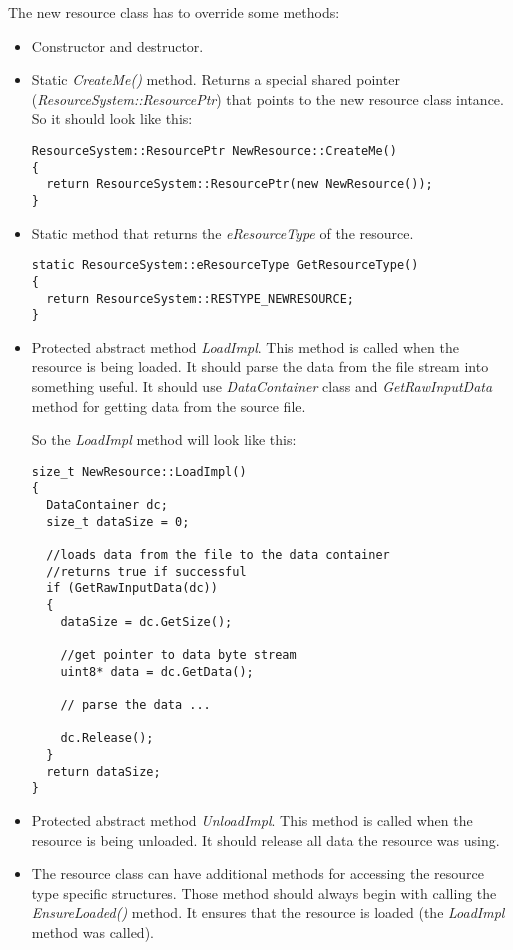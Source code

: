 \documentclass[a4paper, 12pt]{report}
\begin{document}
The new resource class has to override some methods:

\begin{itemize}
\item
Constructor and destructor.
\item
Static \emph{CreateMe()} method. Returns a special shared pointer (\emph{ResourceSystem::ResourcePtr}) that points to the new resource class intance. So it should look like this:

\footnotesize 
\begin{verbatim}
ResourceSystem::ResourcePtr NewResource::CreateMe()
{
  return ResourceSystem::ResourcePtr(new NewResource());
}
\end{verbatim}
\normalsize

\item
Static method that returns the \emph{eResourceType} of the resource.

\footnotesize 
\begin{verbatim}
static ResourceSystem::eResourceType GetResourceType() 
{ 
  return ResourceSystem::RESTYPE_NEWRESOURCE; 
}
\end{verbatim}
\normalsize

\item
Protected abstract method \emph{LoadImpl}. This method is called when the resource is being loaded. It should parse the data from the file stream into something useful. It should use \emph{DataContainer} class and \emph{GetRawInputData} method for getting data from the source file.

So the \emph{LoadImpl} method will look like this:

\footnotesize 
\begin{verbatim}
size_t NewResource::LoadImpl()
{
  DataContainer dc;
  size_t dataSize = 0;

  //loads data from the file to the data container
  //returns true if successful
  if (GetRawInputData(dc))	
  {
    dataSize = dc.GetSize();

    //get pointer to data byte stream
    uint8* data = dc.GetData();

    // parse the data ...

    dc.Release();
  }
  return dataSize;
}
\end{verbatim}
\normalsize

\item
Protected abstract method \emph{UnloadImpl}. This method is called when the resource is being unloaded. It should release all data the resource was using.

\item
The resource class can have additional methods for accessing the resource type specific structures. Those method should always begin with calling the \emph{EnsureLoaded()} method. It ensures that the resource is loaded (the \emph{LoadImpl} method was called).

\end{itemize}
\end{document}

